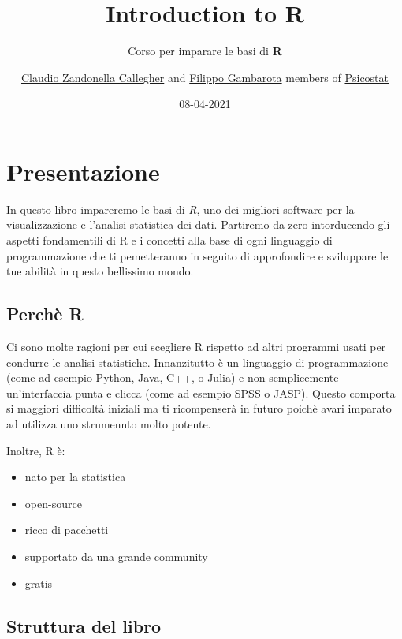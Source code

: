 \documentclass[
]{book}
\title{{Introduction to R}}
\subtitle{Corso per imparare le basi di \textbf{R}}
\author{\href{https://claudiozandonella.netlify.app/}{Claudio Zandonella Callegher} and \href{https://filippogambarota.netlify.app/}{Filippo Gambarota} members of \href{https://psicostat.dpss.psy.unipd.it/}{Psicostat}}
\date{08-04-2021}
\providecommand{\tightlist}{%
  \setlength{\itemsep}{0pt}\setlength{\parskip}{0pt}}
\begin{document}
\maketitle

{
\setcounter{tocdepth}{1}
\tableofcontents
}
\hypertarget{presentazione}{%
\chapter*{Presentazione}\label{presentazione}}

In questo libro impareremo le basi di \emph{R}, uno dei migliori software per la visualizzazione e l'analisi statistica dei dati. Partiremo da zero intorducendo gli aspetti fondamentili di R e i concetti alla base di ogni linguaggio di programmazione che ti pemetteranno in seguito di approfondire e sviluppare le tue abilità in questo bellissimo mondo.

\hypertarget{perchuxe8-r}{%
\section*{Perchè R}\label{perchuxe8-r}}

Ci sono molte ragioni per cui scegliere R rispetto ad altri programmi usati per condurre le analisi statistiche. Innanzitutto è un linguaggio di programmazione (come ad esempio Python, Java, C++, o Julia) e non semplicemente un'interfaccia punta e clicca (come ad esempio SPSS o JASP). Questo comporta si maggiori difficoltà iniziali ma ti ricompenserà in futuro poichè avari imparato ad utilizza uno strumennto molto potente.

Inoltre, R è:

\begin{itemize}
\tightlist
\item
  nato per la statistica
\item
  open-source
\item
  ricco di pacchetti
\item
  supportato da una grande community
\item
  gratis
\end{itemize}

\hypertarget{struttura-del-libro}{%
\section*{Struttura del libro}\label{struttura-del-libro}}
\end{document}
